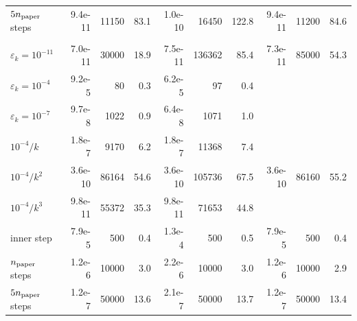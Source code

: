 \begin{table}[htbp]
\begin{tabular}{lrrrrrrrrr}
\quad $5n_{\rm paper}$ steps & 9.4e-11 & 11150 & 83.1 & 1.0e-10 & 16450 & 122.8 & 9.4e-11 & 11200 & 84.6 \\
\addlinespace[2pt]
\multicolumn{10}{l}{TV, $128\times128$ (3 instances)}\\
\quad $\varepsilon_k=10^{-11}$ & 7.0e-11 & 30000 & 18.9 & 7.5e-11 & 136362 & 85.4 & 7.3e-11 & 85000 & 54.3 \\
\quad $\varepsilon_k=10^{-4}$ & 9.2e-5 & 80 & 0.3 & 6.2e-5 & 97 & 0.4 &  &  &  \\
\quad $\varepsilon_k=10^{-7}$ & 9.7e-8 & 1022 & 0.9 & 6.4e-8 & 1071 & 1.0 &  &  &  \\
\quad $10^{-4}/k$ & 1.8e-7 & 9170 & 6.2 & 1.8e-7 & 11368 & 7.4 &  &  &  \\
\quad $10^{-4}/k^{2}$ & 3.6e-10 & 86164 & 54.6 & 3.6e-10 & 105736 & 67.5 & 3.6e-10 & 86160 & 55.2 \\
\quad $10^{-4}/k^{3}$ & 9.8e-11 & 55372 & 35.3 & 9.8e-11 & 71653 & 44.8 &  &  &  \\
\quad 1 inner step & 7.9e-5 & 500 & 0.4 & 1.3e-4 & 500 & 0.5 & 7.9e-5 & 500 & 0.4 \\
\quad $n_{\rm paper}$ steps & 1.2e-6 & 10000 & 3.0 & 2.2e-6 & 10000 & 3.0 & 1.2e-6 & 10000 & 2.9 \\
\quad $5n_{\rm paper}$ steps & 1.2e-7 & 50000 & 13.6 & 2.1e-7 & 50000 & 13.7 & 1.2e-7 & 50000 & 13.4 \\
\bottomrule
\end{tabular}
\end{table}
